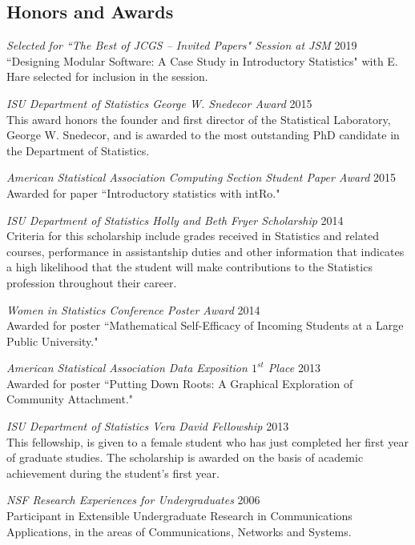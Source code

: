 \documentclass[margin,line]{res}
\begin{document}
\begin{resume}
\section{\sc Honors and Awards}
{\em Selected for ``The Best of JCGS -- Invited Papers" Session at JSM } \hfill 2019\\
``Designing Modular Software: A Case Study in Introductory Statistics" with E. Hare selected for inclusion in the session.

{\em ISU Department of Statistics George W. Snedecor Award } \hfill 2015\\
This award honors the founder and first director of the Statistical Laboratory, George W. Snedecor, and is awarded to the most outstanding PhD candidate in the Department of Statistics.

{\em American Statistical Association Computing Section Student Paper Award } \hfill 2015 \\
Awarded for paper ``Introductory statistics with intRo."

{\em ISU Department of Statistics Holly and Beth Fryer Scholarship } \hfill 2014\\
Criteria for this scholarship include grades received in Statistics and related courses, performance in assistantship duties and other information that indicates a high likelihood that the student will make contributions to the Statistics profession throughout their career.

{\em Women in Statistics Conference Poster Award } \hfill 2014\\
Awarded for poster ``Mathematical Self-Efficacy of Incoming Students at a Large Public University."

{\em American Statistical Association Data Exposition $1^{st}$ Place } \hfill 2013\\
Awarded for poster ``Putting Down Roots: A Graphical Exploration of Community Attachment."

{\em ISU Department of Statistics Vera David Fellowship } \hfill 2013\\
This fellowship, is given to a female student who has just completed her first year of graduate studies. The scholarship is awarded on the basis of academic achievement during the student’s first year.

{\em NSF Research Experiences for Undergraduates } \hfill 2006\\
Participant in Extensible Undergraduate Research in Communications Applications, in the areas of Communications, Networks and Systems.


\end{resume}
\end{document}
